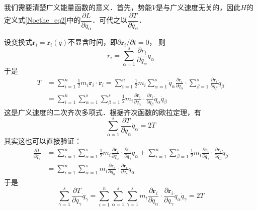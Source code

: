我们需要清楚广义能量函数的意义．首先，势能$V$是与广义速度无关的，因此$H$的定义式\autoref{Noethe_eq2}中的$\dfrac{\partial L}{\partial \dot{q_\alpha}}$．可代之以$\dfrac{\partial T}{\partial \dot{q_\alpha}}$．

设变换式$\boldsymbol{r}_{i}=\boldsymbol{r}_{i}(q)$不显含时间，即$\partial \boldsymbol{r}_{i} / \partial t=0$， 则
\begin{equation}
\dot{r}_{i}=\sum_{\alpha=1}^{s} \frac{\partial r_{i}}{\partial q_{\alpha}} \dot{q}_{\alpha}
\end{equation}
于是
\begin{equation}
\begin{aligned} T &=\sum_{i=1}^{n} \frac{1}{2} m_{i} \dot{\boldsymbol{r}}_{i} \cdot \dot{\boldsymbol{r}}_{i}=\sum_{i=1}^{n} \frac{1}{2} m_{i} \sum_{\alpha=1}^{s} \dot{q}_{\alpha} \frac{\partial \boldsymbol{r}_{i}}{\partial q_{\alpha}} \cdot \sum_{\beta=1}^{s} \frac{\partial \boldsymbol{r}_{i}}{\partial q_{\beta}} \dot{q}_{\beta} \\ &=\sum_{i=1}^{n} \sum_{\alpha=1}^{s} \sum_{\beta=1}^{s} \frac{1}{2} m_{i} \frac{\partial \boldsymbol{r}_{i}}{\partial q_{\alpha}} \cdot \frac{\partial \boldsymbol{r}_{i}}{\partial q_{\beta}} \dot{q}_{\alpha} \dot{q}_{\beta} \end{aligned}
\end{equation}
这是广义速度的二次齐次多项式．根据齐次函数的欧拉定理，有
\begin{equation} \label{Noethe_eq3}
\sum_{\alpha=1}^{s} \frac{\partial T}{\partial \dot{q}_{\alpha}} \dot{q}_{\alpha}=2 T
\end{equation}
其实这也可以直接验证：
\begin{equation}
\begin{aligned} \frac{\partial T}{\partial \dot{q}_{\gamma}} &=\sum_{i=1}^{n} \sum_{\alpha=1}^{s} \frac{1}{2} m_{i} \frac{\partial \boldsymbol{r}_{i}}{\partial q_{\alpha}} \cdot \frac{\partial \boldsymbol{r}_{i}}{\partial q_{\gamma}} \dot{q}_{\alpha}+\sum_{i=1}^{n} \sum_{\beta=1}^{s} \frac{1}{2} m_{i} \frac{\partial \boldsymbol{r}_{i}}{\partial q_{\gamma}} \cdot \frac{\partial \boldsymbol{r}_{i}}{\partial q_{\beta}} \dot{q}_{\beta} \\ &=\sum_{i=1}^{n} \sum_{\alpha=1}^{s} m_{i} \frac{\partial \boldsymbol{r}_{i}}{\partial q_{\alpha}} \cdot \frac{\partial \boldsymbol{r}_{i}}{\partial q_{\gamma}} \dot{q}_{\alpha} \end{aligned}
\end{equation}
于是
\begin{equation}
\sum_{\gamma=1}^{s} \frac{\partial T}{\partial \dot{q}_{\gamma}} \dot{q}_{\gamma}=\sum_{i=1}^{n} \sum_{\alpha=1}^{s} \sum_{\gamma=1}^{s} m_{i} \frac{\partial \boldsymbol{r}_{i}}{\partial q_{\alpha}} \cdot \frac{\partial \boldsymbol{r}_{i}}{\partial q_{\gamma}} \dot{q}_{\alpha} \dot{q}_{\gamma}=2 T
\end{equation}

